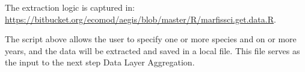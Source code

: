\documentclass[letterpaper,portrait,11pt]{scrartcl}
\numberwithin{equation}{section}    %
\numberwithin{figure}{section}    %
\numberwithin{table}{section}       %
\begin{document}
The extraction logic is captured in: \\
\url{https://bitbucket.org/ecomod/aegis/blob/master/R/marfissci.get.data.R}.

The script above allows the user to specify one or more species and on or more years, and the data will be extracted and saved in a local file.  This file serves as the input to the next step \textendash Data Layer Aggregation.






\end{document}
